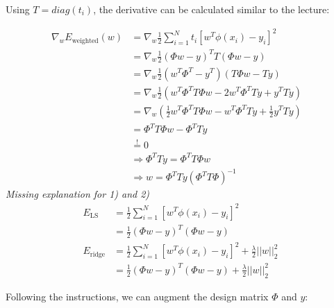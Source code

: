 %
%
%
\begin{flushleft}
Using $T = diag(t_i)$, the derivative can be calculated similar to the lecture:
\end{flushleft}
\begin{align*}
  \nabla_w E_\text{weighted}(w) &= \nabla_w \frac{1}{2} \sum_{i=1}^N t_i \left[w^T \phi(x_i) - y_i\right]^2 \\
  &= \nabla_w \frac{1}{2} (\Phi w - y)^T T (\Phi w - y) \\
  &= \nabla_w \frac{1}{2} (w^T \Phi^T - y^T)(T\Phi w - T y) \\
  &= \nabla_w \frac{1}{2} (w^T \Phi^T T \Phi w - 2w^T \Phi^T T y + y^T T y) \\
  &= \nabla_w (\frac{1}{2} w^T \Phi^T T \Phi w - w^T \Phi^T T y + \frac{1}{2}y^T T y) \\
  &= \Phi^T T \Phi w - \Phi^T T y \\
  &\overset{!}{=} 0
  & \\
  &\Rightarrow \Phi^T T y = \Phi^T T \Phi w \\
  &\Rightarrow w = \Phi^T T y (\Phi^T T \Phi)^{-1} 
\end{align*}
%
\textit{Missing explanation for 1) and 2)}
%
%
%
%
\begin{align*}
  E_\text{LS} &= \frac{1}{2} \sum_{i=1}^N \left[w^T \phi(x_i) - y_i\right]^2 \\
  &= \frac{1}{2} (\Phi w - y)^T (\Phi w - y) \\
  E_\text{ridge} &= \frac{1}{2} \sum_{i=1}^N \left[w^T \phi(x_i) - y_i\right]^2 + \frac{\lambda}{2} ||w||_2^2 \\
  &= \frac{1}{2} (\Phi w - y)^T (\Phi w - y) + \frac{\lambda}{2} ||w||_2^2 
\end{align*}
\begin{flushleft}
Following the instructions, we can augment the design matrix $\Phi$ and $y$:
\end{flushleft}
